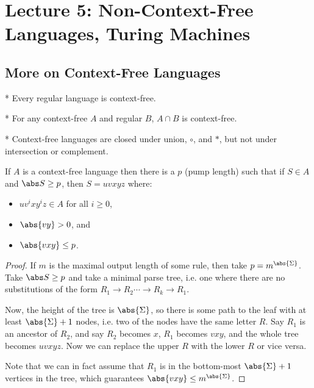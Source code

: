 \section*{Lecture 5: Non-Context-Free Languages, Turing Machines}
\setcounter{section}{5}
\setcounter{subsection}{0}
\setcounter{defn}{0}
\setcounter{defncontainer}{0}

\subsection{More on Context-Free Languages}

\begin{fact}*
	Every regular language is context-free.
\end{fact}

\begin{fact}*
	For any context-free $A$ and regular $B$, $A\cap B$ is context-free.
\end{fact}

\begin{fact}*
	Context-free languages are closed under union, $\circ$, and $*$, but not under intersection or complement.
\end{fact}

\begin{lem}
	If $A$ is a context-free language then there is a $p$ (pump length) such that if $S\in A$ and $\abs S \geq p$, then $S = uvxyz$ where:
	\begin{itemize}
		\item $uv^ixy^iz\in A$ for all $i\geq 0$,
		\item $\abs{vy} > 0$, and
		\item $\abs{vxy} \leq p$.
	\end{itemize}
\end{lem}

\begin{proof}
	If $m$ is the maximal output length of some rule, then take $p = m^{\abs{\Sigma}}$.
	Take $\abs S \geq p$ and take a minimal parse tree, i.e. one where there are no substitutions of the form $R_1\to R_2 \cdots \to R_k\to R_1$.

	Now, the height of the tree is $\abs{\Sigma}$, so there is some path to the leaf with at least $\abs{\Sigma} + 1$ nodes, i.e. two of the nodes have the same letter $R$. Say $R_1$ is an ancestor of $R_2$, and say $R_2$ becomes $x$, $R_1$ becomes $vxy$, and the whole tree becomes $uvxyz$.
	Now we can replace the upper $R$ with the lower $R$ or vice versa.

	Note that we can in fact assume that $R_1$ is in the bottom-most $\abs{\Sigma}+1$ vertices in the tree, which guarantees $\abs{vxy} \leq m^{\abs{\Sigma}}$.
\end{proof}

